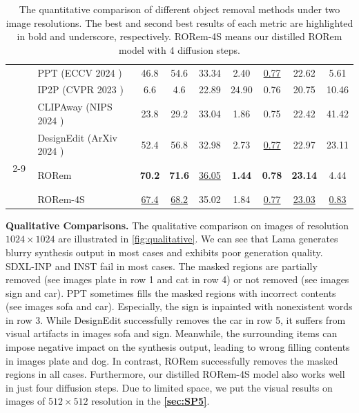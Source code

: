 \documentclass[10pt,twocolumn,letterpaper]{article}
\begin{document}
\begin{table}[t]
\begin{tabular}{@{}c|lccccccc@{}}
    ~ & PPT (ECCV 2024 \cite{zhuang2023task})& 46.8 & 54.6 & 33.34 & 2.40 & \underline{0.77} & 22.62 & 5.61\\
    ~ & IP2P (CVPR 2023 \cite{brooks2023instructpix2pix})& 6.6 & 4.6 & 22.89 & 24.90 & 0.76 & 20.75 & 10.46\\
    ~ & CLIPAway (NIPS 2024 \cite{ekin2024clipaway})& 23.8 & 29.2 & 33.04 & 1.86 & 0.75 & 22.42 & 41.42\\
    ~ & DesignEdit (ArXiv 2024 \cite{jia2024designedit}) & 52.4 & 56.8 & 32.98 & 2.73 & \underline{0.77} & 22.97 & 23.11\\
    \cline{2-9}
    ~ & RORem & \textbf{70.2} & \textbf{71.6} & \underline{36.05} & \textbf{1.44} & \textbf{0.78} & \textbf{23.14} & 4.44 \\
    ~ & RORem-4S & \underline{67.4} & \underline{68.2} & 35.02 & 1.84 & \underline{0.77} & \underline{23.03} & \underline{0.83} \\
    \bottomrule
  \end{tabular}
\vspace{-3mm}
  \caption{The quantitative comparison of different object removal methods under two image resolutions. The best and second best results of each metric are highlighted in bold and underscore, respectively. RORem-4S means our distilled RORem model with 4 diffusion steps.}
  \label{tab:quantitative}
  \vspace{-4mm}
\end{table}

\noindent\textbf{Qualitative Comparisons.} The qualitative comparison on images of resolution $1024 \times 1024$ are illustrated in \cref{fig:qualitative}. We can see that Lama generates blurry synthesis output in most cases and exhibits poor generation quality. SDXL-INP and INST fail in most cases. The masked regions are partially removed (see images plate in row 1 and cat in row 4) or not removed (see images sign and car).  PPT sometimes fills the masked regions with incorrect contents (see images sofa and car). Especially, the sign is inpainted with nonexistent words in row 3. While DesignEdit successfully removes the car in row 5, it suffers from visual artifacts in images sofa and sign. Meanwhile, the surrounding items can impose negative impact on the synthesis output, leading to wrong filling contents in images plate and dog. 
In contrast, RORem successfully removes the masked regions in all cases. Furthermore, our distilled RORem-4S model also works well in just four diffusion steps. Due to limited space, we put the visual results on images of $512 \times 512$ resolution in the \textbf{\cref{sec:SP5}}. 
\end{document}
